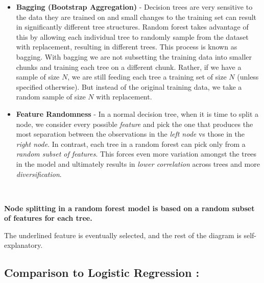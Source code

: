 \documentclass[11pt, a4paper]{book}
\begin{document}
\begin{itemize}
\item
  \textbf{Bagging (Bootstrap Aggregation)} - Decision trees are very
  sensitive to the data they are trained on and small changes to the
  training set can result in significantly different tree structures.
  Random forest takes advantage of this by allowing each individual tree
  to randomly sample from the dataset with replacement, resulting in
  different trees. This process is known as bagging. With bagging we are
  not subsetting the training data into smaller chunks and training each
  tree on a different chunk. Rather, if we have a sample of size \(N\),
  we are still feeding each tree a training set of size \(N\) (unless
  specified otherwise). But instead of the original training data, we
  take a random sample of size \(N\) with replacement.
\item
  \textbf{Feature Randomness} - In a normal decision tree, when it is
  time to split a node, we consider every possible \emph{feature} and
  pick the one that produces the most separation between the
  observations in the \emph{left node} vs those in the \emph{right
  node}. In contrast, each tree in a random forest can pick only from a
  \emph{random subset of features}. This forces even more variation
  amongst the trees in the model and ultimately results in \emph{lower
  correlation} across trees and more \emph{diversification}.
\end{itemize}

    \begin{center}
    \end{center}
    { \hspace*{\fill} \\}

\begin{center}
    \textbf{Node splitting in a random forest model is based on a random
subset of features for each tree.}
\end{center}

The underlined feature is eventually selected, and the rest of the
diagram is self-explanatory.

    \hypertarget{comparison-to-logistic-regression}{%
\subsection{Comparison to Logistic Regression
:}\label{comparison-to-logistic-regression}}
\end{document}
